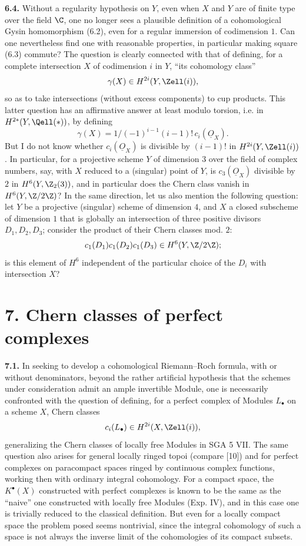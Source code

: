 \textbf{6.4.} Without a regularity hypothesis on $Y$, even when $X$ and $Y$ are of finite type over the field $\C$, one no longer sees a plausible definition of a cohomological Gysin homomorphism (6.2), even for a regular immersion of codimension $1$. Can one nevertheless find one with reasonable properties, in particular making square (6.3) commute? The question is clearly connected with that of defining, for a complete intersection $X$ of codimension $i$ in $Y$, ``its cohomology class''
\[
 \gamma(X)\in H^{2i}(Y,\Zell(i)),
\]
so as to take intersections (without excess components) to cup products. This latter question has an affirmative answer at least modulo torsion, i.e. in $H^{2*}(Y,\Qell(*))$, by defining
\[
 \gamma(X)=1/(-1)^{i-1}(i-1)!\,c_i(\underline{O}_X).
\]
But I do not know whether $c_i(\underline{O}_X)$ is divisible by $(i-1)!$ in $H^{2i}(Y,\Zell(i))$. In particular, for a projective scheme $Y$ of dimension $3$ over the field of complex numbers, say, with $X$ reduced to a (singular) point of $Y$, is $c_3(\underline{O}_X)$ divisible by $2$ in $H^6(Y,\Z_2(3))$, and in particular does the Chern class vanish in $H^6(Y,\Z/2\Z)$? In the same direction, let us also mention the following question: let $Y$ be a projective (singular) scheme of dimension $4$, and $X$ a closed subscheme of dimension $1$ that is globally an intersection of three positive divisors $D_1,D_2,D_3$; consider the product of their Chern classes mod. $2$:
\[
 c_1(D_1)c_1(D_2)c_1(D_3)\in H^6(Y,\Z/2\Z);
\]
%
is this element of $H^6$ independent of the particular choice of the $D_i$ with intersection $X$?

\section*{7. Chern classes of perfect complexes}

\textbf{7.1.} In seeking to develop a cohomological Riemann--Roch formula, with or without denominators, beyond the rather artificial hypothesis that the schemes under consideration admit an ample invertible Module, one is necessarily confronted with the question of defining, for a perfect complex of Modules $L_\bullet$ on a scheme $X$, Chern classes
\[
 c_i(L_\bullet)\in H^{2i}(X,\Zell(i)),
\]
generalizing the Chern classes of locally free Modules in SGA 5 VII. The same question also arises for general locally ringed topoi (compare [10]) and for perfect complexes on paracompact spaces ringed by continuous complex functions, working then with ordinary integral cohomology. For a compact space, the $K^\bullet(X)$ constructed with perfect complexes is known to be the same as the ``naive'' one constructed with locally free Modules (Exp. IV), and in this case one is trivially reduced to the classical definition. But even for a locally compact space the problem posed seems nontrivial, since the integral cohomology of such a space is not always the inverse limit of the cohomologies of its compact subsets.

